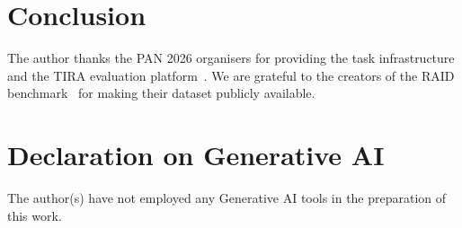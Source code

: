 \documentclass[]{ceurart}
\begin{document}
\section{Conclusion}
\label{sec:conclusion}


\begin{acknowledgments}
The author thanks the PAN 2026 organisers for providing the task infrastructure
and the TIRA evaluation platform~\cite{froebe:2023b}. We are grateful to the creators
of the RAID benchmark~\cite{dugan:2024} for making their dataset publicly available.
\end{acknowledgments}

\section*{Declaration on Generative AI}
The author(s) have not employed any Generative AI tools in the preparation of this work.


\end{document}
